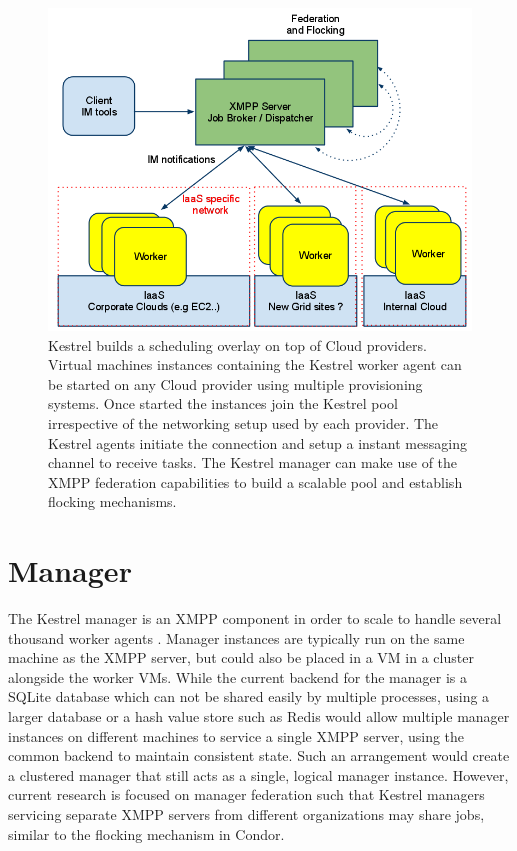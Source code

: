 \begin{figure}
\includegraphics[width=\columnwidth]{figures/kestrel_arch}
\caption{\label{fig:Kestrel-Arch} Kestrel builds a scheduling overlay on top
of Cloud providers. Virtual machines instances containing the Kestrel
worker agent can be started on any Cloud provider using multiple provisioning
systems. Once started the instances join the Kestrel pool irrespective
of the networking setup used by each provider. The Kestrel agents
initiate the connection and setup a instant messaging channel to receive
tasks. The Kestrel manager can make use of the XMPP federation capabilities
to build a scalable pool and establish flocking mechanisms.}
\end{figure}


\section{Manager}
The Kestrel manager is an XMPP component in order to scale to handle
several thousand worker agents \cite{Moffitt2008}. Manager instances
are typically run on the same machine as the XMPP server, but could
also be placed in a VM in a cluster alongside the worker VMs. While
the current backend for the manager is a SQLite \cite{SQLite} database
which can not be shared easily by multiple processes, using a larger
database or a hash value store such as Redis \cite{Redis} would allow
multiple manager instances on different machines to service a single
XMPP server, using the common backend to maintain consistent state.
Such an arrangement would create a clustered manager that still acts
as a single, logical manager instance. However, current research is
focused on manager federation such that Kestrel managers servicing
separate XMPP servers from different organizations may share jobs,
similar to the flocking mechanism in Condor.

